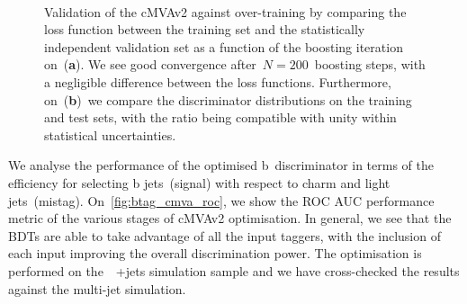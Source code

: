\begin{figure}
\begin{centering}
 \\
\caption[The cMVAv2 BDT loss as a function of boosting iteration]{Validation of the cMVAv2 against over-training by comparing the loss function between the training set and the statistically independent validation set as a function of the boosting iteration on~(\textbf{a}). We see good convergence after~$N=200$~boosting steps, with a negligible difference between the loss functions. Furthermore, on~(\textbf{b})~we compare the discriminator distributions on the training and test sets, with the ratio being compatible with unity within statistical uncertainties.}
\label{fig:btag_loss}
\end{centering}
\end{figure}

We analyse the performance of the optimised b~discriminator in terms of the efficiency for selecting b jets~(signal) with respect to charm and light jets~(mistag). On~\cref{fig:btag_cmva_roc}, we show the ROC AUC performance metric of the various stages of cMVAv2 optimisation. In general, we see that the BDTs are able to take advantage of all the input taggers, with the inclusion of each input improving the overall discrimination power. The optimisation is performed on the~\ttbar~+jets simulation sample and we have cross-checked the results against the multi-jet simulation.

